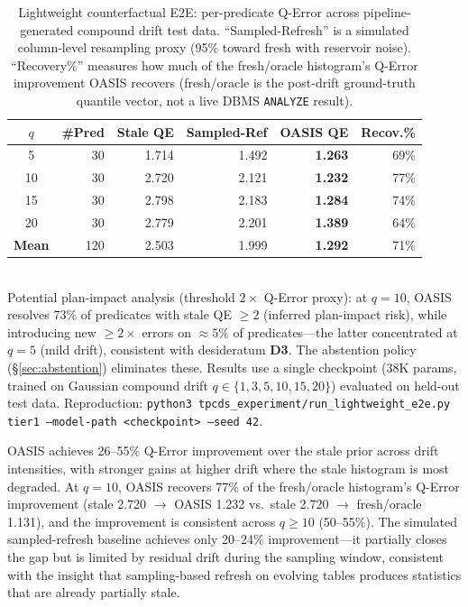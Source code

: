 \documentclass[runningheads]{llncs}
\begin{document}
\begin{table}[t]
  \centering
  \caption{Lightweight counterfactual E2E: per-predicate Q-Error across pipeline-generated compound drift test data. ``Sampled-Refresh'' is a simulated column-level resampling proxy (95\% toward fresh with reservoir noise). ``Recovery\%'' measures how much of the fresh/oracle histogram's Q-Error improvement OASIS recovers (fresh/oracle is the post-drift ground-truth quantile vector, not a live DBMS \texttt{ANALYZE} result).}
  \label{tab:lightweight_e2e}
  \setlength{\tabcolsep}{5pt}
  \begin{tabular}{c r r r r r}
    \toprule
    $q$ & \#Pred & Stale QE & Sampled-Ref & OASIS QE & Recov.\% \\
    \midrule
     5 & 30 & 1.714 & 1.492 & \textbf{1.263} & 69\% \\
    10 & 30 & 2.720 & 2.121 & \textbf{1.232} & 77\% \\
    15 & 30 & 2.798 & 2.183 & \textbf{1.284} & 74\% \\
    20 & 30 & 2.779 & 2.201 & \textbf{1.389} & 64\% \\
    \midrule
    \textbf{Mean} & 120 & 2.503 & 1.999 & \textbf{1.292} & 71\% \\
    \bottomrule
  \end{tabular}
  \\[4pt]
  \small
  Potential plan-impact analysis (threshold $2\times$ Q-Error proxy): at $q{=}10$, OASIS resolves
  73\% of predicates with stale QE $\geq 2$ (inferred plan-impact risk), while
  introducing new ${\geq}2\times$ errors on ${\approx}5\%$ of predicates---the
  latter concentrated at $q{=}5$ (mild drift), consistent with desideratum
  \textbf{D3}. The abstention policy (\S\ref{sec:abstention}) eliminates these.
  Results use a single checkpoint (38K params, trained on Gaussian compound drift
  $q{\in}\{1,3,5,10,15,20\}$) evaluated on held-out test data.
  Reproduction: \texttt{python3 tpcds\_experiment/run\_lightweight\_e2e.py tier1
  --model-path <checkpoint> --seed 42}.
\end{table}

OASIS achieves 26--55\% Q-Error improvement over the stale prior across drift intensities, with stronger gains at higher drift where the stale histogram is most degraded. At $q{=}10$, OASIS recovers 77\% of the fresh/oracle histogram's Q-Error improvement (stale 2.720 $\rightarrow$ OASIS 1.232 vs.\ stale 2.720 $\rightarrow$ fresh/oracle 1.131), and the improvement is consistent across $q{\geq}10$ (50--55\%). The simulated sampled-refresh baseline achieves only 20--24\% improvement---it partially closes the gap but is limited by residual drift during the sampling window, consistent with the insight that sampling-based refresh on evolving tables produces statistics that are already partially stale.
\end{document}
